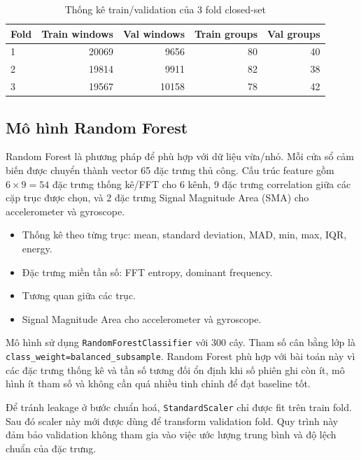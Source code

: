 \documentclass[12pt,a4paper]{article}
\begin{document}
\begin{table}[H]
    \centering
    \caption{Thống kê train/validation của 3 fold closed-set}
    \label{tab:fold-split-stats}
    \begin{tabular}{lrrrr}
        \toprule
        Fold & Train windows & Val windows & Train groups & Val groups \\
        \midrule
        1 & 20069 & 9656 & 80 & 40 \\
        2 & 19814 & 9911 & 82 & 38 \\
        3 & 19567 & 10158 & 78 & 42 \\
        \bottomrule
    \end{tabular}
\end{table}

\subsection{Mô hình Random Forest}

Random Forest là phương pháp để phù hợp với dữ liệu vừa/nhỏ. Mỗi cửa sổ cảm biến được chuyển thành vector 65 đặc trưng thủ công. Cấu trúc feature gồm \(6 \times 9 = 54\) đặc trưng thống kê/FFT cho 6 kênh, 9 đặc trưng correlation giữa các cặp trục được chọn, và 2 đặc trưng Signal Magnitude Area (SMA) cho accelerometer và gyroscope.

\begin{itemize}
    \item Thống kê theo từng trục: mean, standard deviation, MAD, min, max, IQR, energy.
    \item Đặc trưng miền tần số: FFT entropy, dominant frequency.
    \item Tương quan giữa các trục.
    \item Signal Magnitude Area cho accelerometer và gyroscope.
\end{itemize}

Mô hình sử dụng \texttt{RandomForestClassifier} với 300 cây. Tham số cân bằng lớp là \texttt{class\_weight=balanced\_subsample}. Random Forest phù hợp với bài toán này vì các đặc trưng thống kê và tần số tương đối ổn định khi số phiên ghi còn ít, mô hình ít tham số và không cần quá nhiều tinh chỉnh để đạt baseline tốt.

Để tránh leakage ở bước chuẩn hoá, \texttt{StandardScaler} chỉ được fit trên train fold. Sau đó scaler này mới được dùng để transform validation fold. Quy trình này đảm bảo validation không tham gia vào việc ước lượng trung bình và độ lệch chuẩn của đặc trưng.
\end{document}
